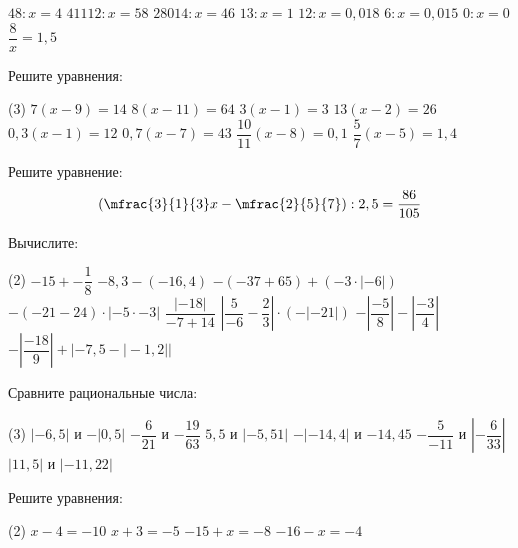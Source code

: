 \begin{class}[number=1-2]
\begin{listofex}[resume]
\begin{tasks}
			\task \( 48 : x =4 \)
			\task \( 41112 : x =58 \)
			\task \( 28014 : x = 46 \)
			\task \( 13 : x =1 \)
			\task \( 12 : x = 0,018 \)
			\task \( 6:x = 0,015 \)
			\task \( 0:x = 0 \)
			\task \( \dfrac{8}{x}=1,5 \)
		\end{tasks}
		\item Решите уравнения:
		\begin{tasks}(3) %
			\task \( 7(x-9)=14 \)
			\task \( 8(x-11)=64 \)
			\task \( 3(x-1)=3 \)
			\task \( 13(x-2)=26 \)
			\task \( 0,3(x-1)=12 \)
			\task \( 0,7(x-7)=43 \)
			\task \( \dfrac{10}{11}(x-8)=0,1 \)
			\task \( \dfrac{5}{7}(x-5)=1,4 \)
		\end{tasks}
		\item Решите уравнение: \[ \left( \mfrac{3}{1}{3}x-\mfrac{2}{5}{7} \right):2,5 = \dfrac{86}{105}  \]
	\end{listofex}
\end{class}

\begin{homework}[number=1]
	\begin{listofex}
		\item Вычислите:
		\begin{tasks}(2)
			\task \( -15 + -\dfrac{1}{8} \)
			\task \( -8,3-(-16,4) \)
			\task \( -(-37+65)+(-3 \cdot |-6|) \)
			\task \( -(-21-24) \cdot |-5 \cdot -3| \)
			\task \( \dfrac{|-18|}{-7+14} \)
			\task \( \left| \dfrac{5}{-6}-\dfrac{2}{3} \right| \cdot (-|-21|) \)
			\task \(  -\left|\dfrac{-5}{8}\right|-|\dfrac{-3}{4}| \)
			\task \(  -\left| \dfrac{-18}{9} \right| + |-7,5-|-1,2|| \)
		\end{tasks}
		\item Сравните рациональные числа:
		\begin{tasks}(3)
			\task \( |-6,5| \) и \( -|0,5| \)
			\task \( -\dfrac{6}{21} \) и \( -\dfrac{19}{63} \)
			\task \( 5,5 \) и \( |-5,51| \)
			\task \( -|-14,4| \) и \( -14,45 \)
			\task \( -\dfrac{5}{-11} \) и \( \left| -\dfrac{6}{33} \right| \)
			\task \( |11,5| \) и \( |-11,22| \)
		\end{tasks}
		\item Решите уравнения:
		\begin{tasks}(2)
			\task \( x-4=-10 \)
			\task \( x+3=-5 \)
			\task \( -15+x=-8 \)
			\task \( -16-x=-4 \)
		\end{tasks}
	\end{listofex}
\end{homework}

